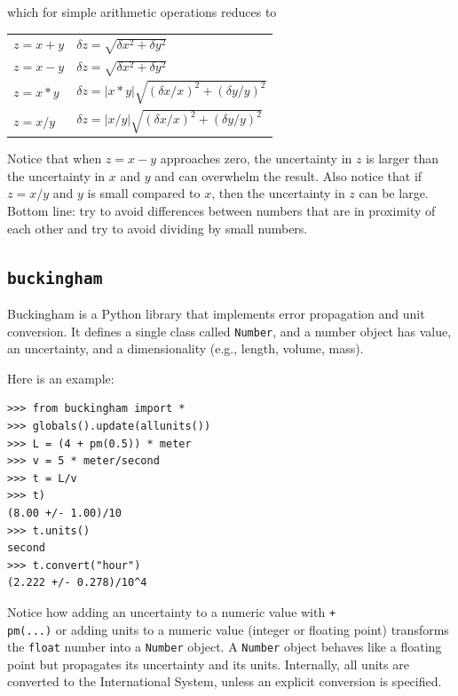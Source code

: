 \documentclass[justified, sixbynine]{tufte-book}
\def\ft{\small\tt}
\theoremstyle{plain}%
\newtheorem * {corollary}{Corollary}
\theoremstyle{definition}
\theoremstyle{remark}
\newtheorem * {remark}{Remark}
\newtheorem * {note}{Note}
\begin{document}
\begin{fullwidth}
which for simple arithmetic operations reduces to

\begin{tabular}{ll}
  $z = x + y$ &
  $\delta z = \sqrt{\delta x^2 + \delta y^2 }$ \\
  $z = x - y$ &
  $\delta z = \sqrt{\delta x^2 + \delta y^2 }$ \\
  $z = x * y$ &
  $\delta z = |x * y|\sqrt{(\delta x/x)^2 + (\delta y/y)^2 }$ \\
  $z = x / y$ &
  $\delta z = |x/y|\sqrt{(\delta x/x)^2 + (\delta y/y)^2 }$ \\
\end{tabular}

Notice that when $z=x-y$ approaches zero, the uncertainty in $z$ is larger than the uncertainty in $x$ and $y$ and can overwhelm the result.
Also notice that if $z=x/y$ and $y$ is small compared to $x$, then the uncertainty in $z$ can be large.
Bottom line: try to avoid differences between numbers that are in proximity of each other and try to avoid dividing by small numbers.

\goodbreak\subsection{{\ft buckingham}}

Buckingham is a Python library that implements error propagation and unit conversion. It defines a single class called {\ft Number}, and a number object has value, an uncertainty, and a dimensionality (e.g., length, volume, mass).

Here is an example:

\begin{lstlisting}
>>> from buckingham import * 
>>> globals().update(allunits())
>>> L = (4 + pm(0.5)) * meter
>>> v = 5 * meter/second
>>> t = L/v
>>> t)                                                                                               
(8.00 +/- 1.00)/10
>>> t.units()
second
>>> t.convert("hour")
(2.222 +/- 0.278)/10^4
\end{lstlisting}

Notice how adding an uncertainty to a numeric value with {\ft +\\pm(...)} or adding units to a numeric value (integer or floating point) transforms the {\ft float} number into a {\ft Number} object. A {\ft Number} object behaves like a floating point but propagates its uncertainty and its units.  Internally, all units are converted to the International System, unless an explicit conversion is specified.


\end{fullwidth}
\end{document}
